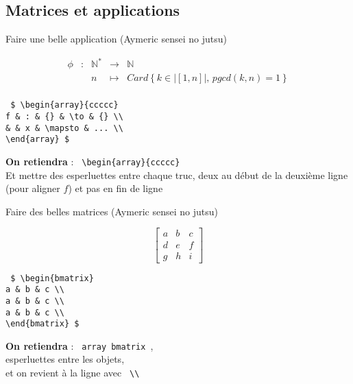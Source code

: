 \documentclass{report}
\begin{document}
\subsection*{Matrices et applications}

Faire une belle application (Aymeric sensei no jutsu)

$$
\begin{array}{ccccc} 
\phi & : & \mathbb{N}^* & \to & \mathbb{N} \\ 
& & n & \mapsto & Card \left\{ k \in |[1,n]|, \, pgcd(k,n) = 1 \right\} \\ 
\end{array}
$$


\texttt{
\$ \textbackslash{}begin\{array\}\{ccccc\}  \\
f \& : \& \{\} \& \textbackslash{}to \& \{\} \textbackslash{}\textbackslash{}  \\
\& \& x \& \textbackslash{}mapsto \& ... \textbackslash{}\textbackslash{}  \\
\textbackslash{}end\{array\} \$
}

\textbf{On retiendra} : 
\texttt{ \textbackslash{}begin\{array\}\{ccccc\} } \\
Et mettre des esperluettes entre chaque truc, deux au début de la deuxième ligne (pour aligner $f$)
et pas en fin de ligne

Faire des belles matrices (Aymeric sensei no jutsu)

$$
\begin{bmatrix} 
a & b & c \\
d & e & f \\
g & h & i
\end{bmatrix}
$$

\texttt{
\$ \textbackslash{}begin\{bmatrix\}  \\
a \& b \& c \textbackslash{}\textbackslash{}  \\
a \& b \& c \textbackslash{}\textbackslash{}  \\
a \& b \& c \textbackslash{}\textbackslash{}  \\
\textbackslash{}end\{bmatrix\} \$
}

\textbf{On retiendra} : \texttt{ array bmatrix }, \\
esperluettes entre les objets, \\
et on revient à la ligne avec \texttt{ \textbackslash{}\textbackslash{} } 

\end{document}

